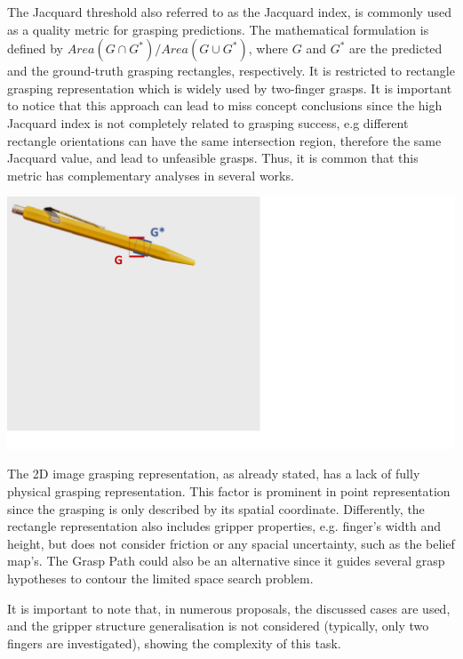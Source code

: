 \begin{tcolorbox}[every float=\centering, drop shadow, title= Jacquard threshold]
	
	The Jacquard threshold also referred to as the Jacquard index, is commonly used as a quality metric for grasping predictions. The mathematical formulation is defined by $Area(G\cap G^*)/Area(G\cup G^*)$, where $G$ and $G^*$ are the predicted and the ground-truth grasping rectangles, respectively. It is restricted to rectangle grasping representation which is widely used by two-finger grasps. It is important to notice that this approach can lead to miss concept conclusions since the high Jacquard index is not completely related to grasping success, e.g different rectangle orientations can have the same intersection region, therefore the same Jacquard value, and lead to unfeasible grasps. Thus, it is common that this metric has complementary analyses in several works.
	
	\vspace*{1ex}
	
	\centerline{\includegraphics[trim={0cm 12.5cm 17cm 0cm},clip,width=.65\linewidth,angle=0]{Cap2/Figuras/pen_jacquard.pdf}}
	\label{fig:pen_jacquard}
\end{tcolorbox}

The 2D image grasping representation, as already stated, has a lack of fully physical grasping representation. This factor is prominent in point representation since the grasping is only described by its spatial coordinate. Differently, the rectangle representation also includes gripper properties, e.g. finger's width and height, but does not consider friction or any spacial uncertainty, such as the belief map's. The Grasp Path could also be an alternative since it guides several grasp hypotheses to contour the limited space search problem.

It is important to note that, in numerous proposals, the discussed cases are used, and the gripper structure generalisation is not considered (typically, only two fingers are investigated), showing the complexity of this task.

